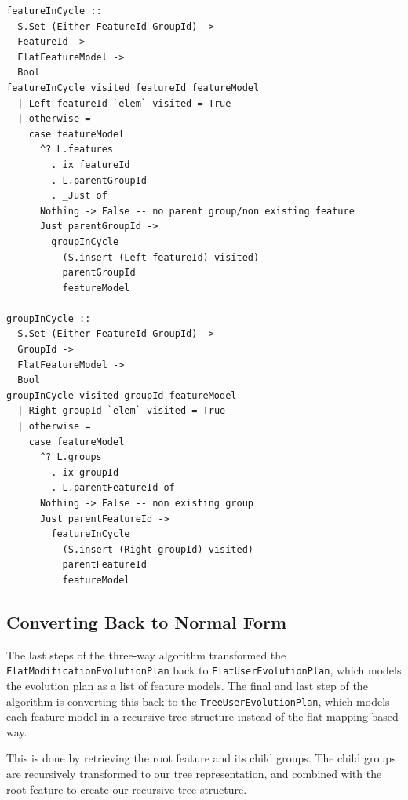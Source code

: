 \documentclass[a4paper,english]{ifimaster}
\begin{document}
\begin{verbatim}
featureInCycle ::
  S.Set (Either FeatureId GroupId) ->
  FeatureId ->
  FlatFeatureModel ->
  Bool
featureInCycle visited featureId featureModel
  | Left featureId `elem` visited = True
  | otherwise =
    case featureModel
      ^? L.features
        . ix featureId
        . L.parentGroupId
        . _Just of
      Nothing -> False -- no parent group/non existing feature
      Just parentGroupId ->
        groupInCycle
          (S.insert (Left featureId) visited)
          parentGroupId
          featureModel

groupInCycle ::
  S.Set (Either FeatureId GroupId) ->
  GroupId ->
  FlatFeatureModel ->
  Bool
groupInCycle visited groupId featureModel
  | Right groupId `elem` visited = True
  | otherwise =
    case featureModel
      ^? L.groups
        . ix groupId
        . L.parentFeatureId of
      Nothing -> False -- non existing group
      Just parentFeatureId ->
        featureInCycle
          (S.insert (Right groupId) visited)
          parentFeatureId
          featureModel
\end{verbatim}

\subsection{Converting Back to Normal Form}%
\label{sub:converting_back_to_normal_form}

The last steps of the three-way algorithm transformed the \texttt{Flat\-Modification\-Evolution\-Plan} back to \texttt{Flat\-User\-Evolution\-Plan}, which models the evolution plan as a list of feature models. The final and last step of the algorithm is converting this back to the \texttt{Tree\-User\-Evolution\-Plan}, which models each feature model in a recursive tree-structure instead of the flat mapping based way.

This is done by retrieving the root feature and its child groups. The child groups are recursively transformed to our tree representation, and combined with the root feature to create our recursive tree structure.
\end{document}
